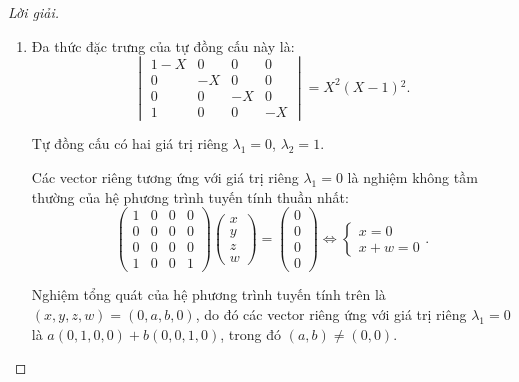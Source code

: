\documentclass[class=linearalgebra,crop=false]{standalone}
\begin{document}
\begin{proof}[Lời giải]
\begin{enumerate}[label = (\alph*)]
        \item Đa thức đặc trưng của tự đồng cấu này là:
              \[
                  \begin{vmatrix}
                      1 - X & 0  & 0  & 0  \\
                      0     & -X & 0  & 0  \\
                      0     & 0  & -X & 0  \\
                      1     & 0  & 0  & -X
                  \end{vmatrix}
                  = X^{2}(X-1){}^{2}.
              \]
              \par Tự đồng cấu có hai giá trị riêng $\lambda_{1} = 0$, $\lambda_{2} = 1$.
              \par Các vector riêng tương ứng với giá trị riêng $\lambda_{1} = 0$ là nghiệm không tầm thường của hệ phương trình tuyến tính thuần nhất:
              \[
                  \begin{pmatrix}
                      1 & 0 & 0 & 0 \\
                      0 & 0 & 0 & 0 \\
                      0 & 0 & 0 & 0 \\
                      1 & 0 & 0 & 1
                  \end{pmatrix}
                  \begin{pmatrix}
                      x \\
                      y \\
                      z \\
                      w
                  \end{pmatrix}
                  =
                  \begin{pmatrix}
                      0 \\
                      0 \\
                      0 \\
                      0
                  \end{pmatrix}
                  \Longleftrightarrow
                  \begin{cases}
                      x = 0 \\
                      x + w = 0
                  \end{cases}.
              \]
              \par Nghiệm tổng quát của hệ phương trình tuyến tính trên là $(x, y, z, w) = (0, a, b, 0)$, do đó các vector riêng ứng với giá trị riêng $\lambda_{1} = 0$ là $a(0, 1, 0, 0) + b(0, 0, 1, 0)$, trong đó $(a, b)\ne (0, 0)$.

\end{enumerate}
\end{proof}
\end{document}
